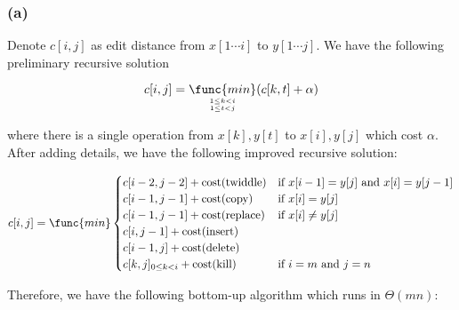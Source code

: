 \subsubsection*{(a)}

\noindent
Denote $c[i, j]$ as edit distance from $x[1 \cdots i]$ to $y[1 \cdots j]$.
We have the following preliminary recursive solution

\begin{equation*}
    c[i,j] = \mathop{\func{min}}\limits_{1 \leq k < i \atop 1 \leq t < j}
        (c[k,t] + \alpha)
\end{equation*}

\noindent
where there is a single operation from $x[k], y[t]$ to $x[i], y[j]$
which cost $\alpha$.
After adding details, we have the following improved recursive solution:

\begin{equation*}
    c[i,j] = \func{min} 
    \begin{cases}
        c[i-2,j-2] + \text{cost(twiddle)} 
            & \text{if } x[i-1]=y[j] \text{ and } x[i]=y[j-1] \\
        c[i-1,j-1] + \text{cost(copy)} & \text{if } x[i]=y[j] \\
        c[i-1,j-1] + \text{cost(replace)} & \text{if } x[i] \neq y[j] \\
        c[i,j-1] + \text{cost(insert)} \\
        c[i-1,j] + \text{cost(delete)} \\
        c[k,j]_{0 \leq k < i} + \text{cost(kill)} 
            & \text{if } i = m \text{ and } j = n
    \end{cases}
\end{equation*}

\noindent
Therefore, we have the following bottom-up algorithm which runs in $\Theta(mn)$:

